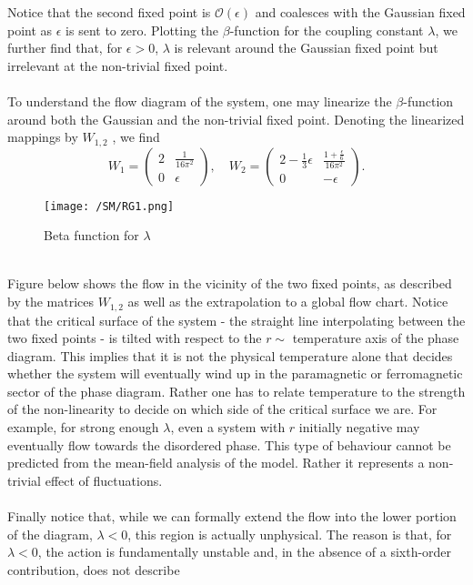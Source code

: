 Notice that the second fixed point is $\mathcal{O}(\epsilon)$ and coalesces with the Gaussian fixed point as $\epsilon$ is sent to zero. Plotting the $\beta$-function for the coupling constant $\lambda$, we further find that, for $\epsilon > 0$, $\lambda$ is relevant around the Gaussian fixed point but irrelevant at the non-trivial fixed point.
\\ \\
To understand the flow diagram of the system, one may linearize the $\beta$-function around both the Gaussian and the non-trivial fixed point. Denoting the linearized mappings by $W_{1,2}$ , we find
\[W_1 = \begin{pmatrix} 2 & \frac{1}{16\pi^2} \\ 0 & \epsilon \end{pmatrix} , \quad W_2 = \begin{pmatrix} 2 - \frac{1}{3}\epsilon & \frac{1+ \frac{\epsilon}{6}}{16\pi^2}\\  0 & -\epsilon \end{pmatrix} .\]
\begin{figure}[!h]
\centering
\texttt{[image: /SM/RG1.png]}
\caption{Beta function for $\lambda$}
\end{figure}
\\
Figure below shows the flow in the vicinity of the two fixed points, as described by the matrices $W_{1,2}$ as well as the extrapolation to a global flow chart.
Notice that the critical surface of the system - the straight line interpolating between the two fixed points - is tilted with respect to the $r \sim$ temperature axis of the phase diagram. 
This implies that it is not the physical temperature alone that decides whether the system will eventually wind up in the paramagnetic or ferromagnetic sector of the phase diagram. 
Rather one has to relate temperature to the strength of the non-linearity to decide on which side of the critical surface we are. 
For example, for strong enough $\lambda$, even a system with $r$ initially negative may eventually flow towards the disordered phase. This type of behaviour cannot be predicted from the mean-field analysis of the model. Rather it represents a non-trivial effect of fluctuations.
\\ \\
Finally notice that, while we can formally extend the flow into the lower portion of the diagram, $\lambda < 0$, this region is actually unphysical. The reason is that, for $\lambda < 0$, the action is fundamentally unstable and, in the absence of a sixth-order contribution, does not describe

